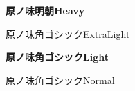 \documentclass[dvipdfmx]{jsarticle}
\begin{document}
\mcfamily\bfseries
{\Large 原ノ味明朝\textmd{Heavy}}

\testAll

\clearpage

\gtfamily\mdseries
{\Large 原ノ味角ゴシック\textmd{ExtraLight}}

\testAll

\vspace{\baselineskip}

\gtfamily\bfseries
{\Large 原ノ味角ゴシック\textmd{Light}}

\testAll

\vspace{\baselineskip}

\gtfamily\ebseries
{\Large 原ノ味角ゴシック\textmd{Normal}}

\testAll
\end{document}

